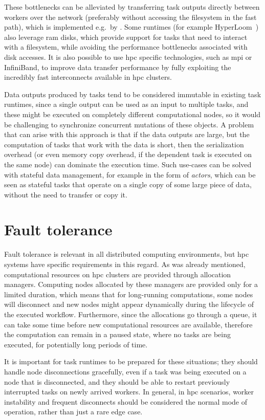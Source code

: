 These bottlenecks can be alleviated by transferring task outputs directly between workers over the
network (preferably without accessing the filesystem in the fast path), which is implemented e.g.\
by \dask{}. Some runtimes (for example HyperLoom~\cite{hyperloom})
also leverage \gls{ram} disks, which provide support for tasks that need to
interact with a filesystem, while avoiding the performance bottlenecks associated with disk
accesses. It is also possible to use \gls{hpc} specific technologies, such as
\gls{mpi} or InfiniBand, to improve data transfer performance by fully exploiting
the incredibly fast interconnects available in \gls{hpc} clusters.

Data outputs produced by tasks tend to be considered immutable in existing task runtimes, since a
single output can be used as an input to multiple tasks, and these might be executed on completely
different computational nodes, so it would be challenging to synchronize concurrent mutations of
these objects. A problem that can arise with this approach is that if the data outputs are large,
but the computation of tasks that work with the data is short, then the serialization overhead (or
even memory copy overhead, if the dependent task is executed on the same node) can dominate the
execution time. Such use-cases can be solved with stateful data management, for example in the form
of \emph{actors}, which can be seen as stateful tasks that operate on a single copy
of some large piece of data, without the need to transfer or copy it.

\section{Fault tolerance}
Fault tolerance is relevant in all distributed computing environments, but
\gls{hpc} systems have specific requirements in this regard. As was already
mentioned, computational resources on \gls{hpc} clusters are provided through
allocation managers. Computing nodes allocated by these managers are provided only for a limited
duration, which means that for long-running computations, some nodes will disconnect and new nodes
might appear dynamically during the lifecycle of the executed workflow. Furthermore, since the
allocations go through a queue, it can take some time before new computational resources are
available, therefore the computation can remain in a paused state, where no tasks are being
executed, for potentially long periods of time.

It is important for task runtimes to be prepared for these situations; they should handle node
disconnections gracefully, even if a task was being executed on a node that is disconnected, and
they should be able to restart previously interrupted tasks on newly arrived workers. In general,
in \gls{hpc} scenarios, worker instability and frequent disconnects should be
considered the normal mode of operation, rather than just a rare edge case.

